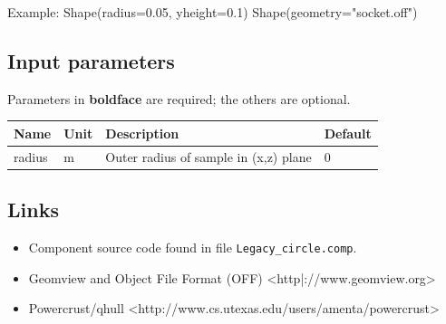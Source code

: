 Example: Shape(radius=0.05, yheight=0.1) Shape(geometry="socket.off")

\subsection*{Input parameters}
Parameters in \textbf{boldface} are required; the others are optional.

\begin{longtable}{p{}p{}p{}p{}}
\toprule
\textbf{Name} & \textbf{Unit} & \textbf{Description} & \textbf{Default} \\
\midrule
\endhead
radius & m & Outer radius of sample in (x,z) plane & 0 \\
\bottomrule
\end{longtable}

\subsection*{Links}
\begin{itemize}
  \item Component source code found in file \texttt{Legacy\_circle.comp}.
  \item Geomview and Object File Format (OFF) \textless{}http|://www.geomview.org\textgreater{}
  \item Powercrust/qhull \textless{}http://www.cs.utexas.edu/users/amenta/powercrust\textgreater{}
\end{itemize}
